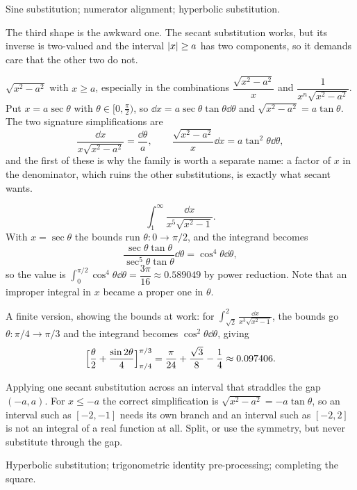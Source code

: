 \begin{seealsob}Sine substitution; numerator alignment; hyperbolic substitution.\end{seealsob}

The third shape is the awkward one. The secant substitution works, but its inverse is two-valued and the interval $\left\lvert x\right\rvert\geq a$ has two components, so it demands care that the other two do not.

\cue $\sqrt{x^2-a^2}$ with $x\geq a$, especially in the combinations $\dfrac{\sqrt{x^2-a^2}}{x}$ and $\dfrac{1}{x^n\sqrt{x^2-a^2}}$.
\method Put $x=a\sec\theta$ with $\theta\in[0,\tfrac\pi2)$, so $\dd x=a\sec\theta\tan\theta\dd\theta$ and $\sqrt{x^2-a^2}=a\tan\theta$. The two signature simplifications are
\[
\frac{\dd x}{x\sqrt{x^2-a^2}}=\frac{\dd\theta}{a},
\qquad
\frac{\sqrt{x^2-a^2}}{x}\dd x=a\tan^2\theta\dd\theta ,
\]
and the first of these is why the family is worth a separate name: a factor of $x$ in the denominator, which ruins the other substitutions, is exactly what secant wants.

\begin{worked}
\[
\int_1^{\infty}\frac{\dd x}{x^5\sqrt{x^2-1}} .
\]
With $x=\sec\theta$ the bounds run $\theta:0\to\pi/2$, and the integrand becomes
\[
\frac{\sec\theta\tan\theta}{\sec^5\theta\tan\theta}\dd\theta=\cos^4\theta\dd\theta ,
\]
so the value is $\int_0^{\pi/2}\cos^4\theta\dd\theta=\dfrac{3\pi}{16}\approx0.589049$ by power reduction. Note that an improper integral in $x$ became a proper one in $\theta$.

A finite version, showing the bounds at work: for $\displaystyle\int_{\sqrt2}^{2}\frac{\dd x}{x^3\sqrt{x^2-1}}$, the bounds go $\theta:\pi/4\to\pi/3$ and the integrand becomes $\cos^2\theta\dd\theta$, giving
\[
\Bigl[\frac\theta2+\frac{\sin2\theta}{4}\Bigr]_{\pi/4}^{\pi/3}=\frac{\pi}{24}+\frac{\sqrt3}{8}-\frac14\approx0.097406 .
\]
\end{worked}

\begin{trap}
Applying one secant substitution across an interval that straddles the gap $(-a,a)$. For $x\leq-a$ the correct simplification is $\sqrt{x^2-a^2}=-a\tan\theta$, so an interval such as $[-2,-1]$ needs its own branch and an interval such as $[-2,2]$ is not an integral of a real function at all. Split, or use the symmetry, but never substitute through the gap.
\end{trap}

\begin{seealsob}Hyperbolic substitution; trigonometric identity pre-processing; completing the square.\end{seealsob}

